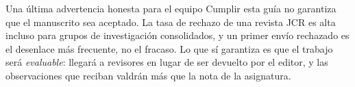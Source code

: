 \documentclass[11pt,a4paper]{article}
\begin{document}
\vspace{8pt}
\begin{aviso}{Una última advertencia honesta para el equipo}
	Cumplir esta guía no garantiza que el manuscrito sea aceptado. La tasa de rechazo de una revista JCR es alta incluso para grupos de investigación consolidados, y un primer envío rechazado es el desenlace más frecuente, no el fracaso. Lo que sí garantiza es que el trabajo será \emph{evaluable}: llegará a revisores en lugar de ser devuelto por el editor, y las observaciones que reciban valdrán más que la nota de la asignatura.
\end{aviso}

\nocite{*}


\end{document}

